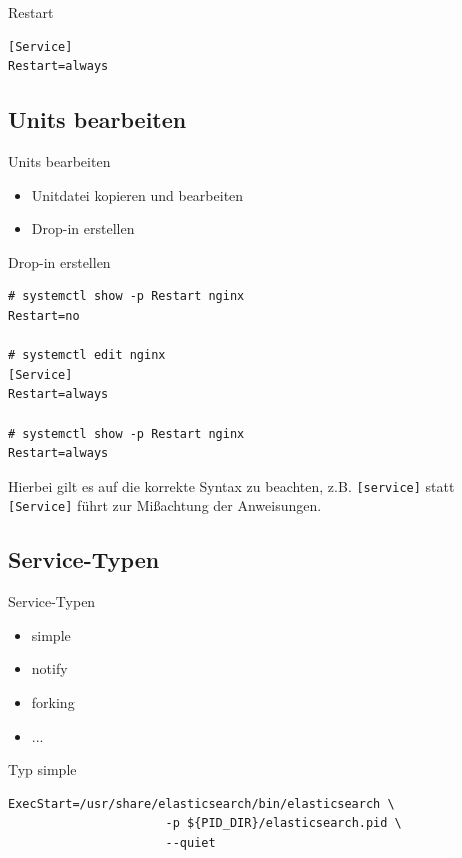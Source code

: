 \begin{frame}[fragile]{Restart}
\begin{lstlisting}
[Service]	
Restart=always
\end{lstlisting}
\end{frame}

\subsection{Units bearbeiten}
\begin{frame}{Units bearbeiten}
  \begin{itemize}
    \item Unitdatei kopieren und bearbeiten
    \item Drop-in erstellen
  \end{itemize}
\end{frame}

\begin{frame}[fragile]{Drop-in erstellen}
	\begin{lstlisting}
# systemctl show -p Restart nginx
Restart=no

# systemctl edit nginx
[Service]
Restart=always

# systemctl show -p Restart nginx
Restart=always
\end{lstlisting}
\end{frame}

Hierbei gilt es auf die korrekte Syntax zu beachten, z.B. \verb|[service]| statt \verb|[Service]|
führt zur Mißachtung der Anweisungen.

\subsection{Service-Typen}

\begin{frame}{Service-Typen}
\begin{itemize}
\item simple
\item notify
\item forking
\item ...
\end{itemize}
\end{frame}

\begin{frame}[fragile]{Typ simple}
\begin{lstlisting}
ExecStart=/usr/share/elasticsearch/bin/elasticsearch \
                      -p ${PID_DIR}/elasticsearch.pid \
                      --quiet
\end{lstlisting}
\end{frame}

